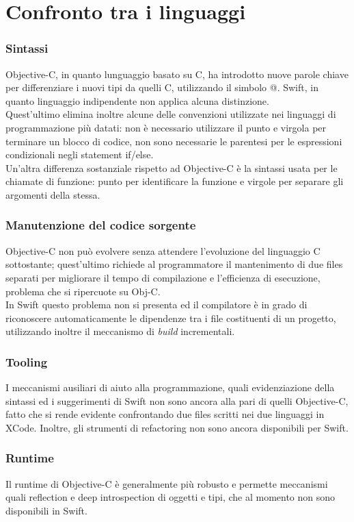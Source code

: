 \chapter{Confronto tra i linguaggi}
\subsection{Sintassi}
Objective-C, in quanto lunguaggio basato su C, ha introdotto nuove parole chiave per differenziare i nuovi tipi da quelli C, utilizzando il simbolo @. Swift, in quanto linguaggio indipendente non applica alcuna distinzione.\\
Quest'ultimo elimina inoltre alcune delle convenzioni utilizzate nei linguaggi di programmazione più datati: non è necessario utilizzare il punto e virgola per terminare un blocco di codice, non sono necessarie le parentesi per le espressioni condizionali negli statement if/else.\\
Un'altra differenza sostanziale rispetto ad Objective-C è la sintassi usata per le chiamate di funzione: punto per identificare la funzione e virgole per separare gli argomenti della stessa.
\subsection{Manutenzione del codice sorgente}
Objective-C non può evolvere senza attendere l'evoluzione del linguaggio C sottostante; quest'ultimo richiede al programmatore il mantenimento di due files separati per migliorare il tempo di compilazione e l'efficienza di esecuzione, problema che si ripercuote su Obj-C.\\
In Swift questo problema non si presenta ed il compilatore è in grado di riconoscere automaticamente le dipendenze tra i file costituenti di un progetto, utilizzando inoltre il meccanismo di \textit{build} incrementali.
\subsection{Tooling}
I meccanismi ausiliari di aiuto alla programmazione, quali evidenziazione della sintassi ed i suggerimenti di Swift non sono ancora alla pari di quelli Objective-C, fatto che si rende evidente confrontando due files scritti nei due linguaggi in XCode. Inoltre, gli strumenti di refactoring non sono ancora disponibili per Swift.
\subsection{Runtime}
Il runtime di Objective-C è generalmente più robusto e permette meccanismi quali reflection e deep introspection di oggetti e tipi, che al momento non sono disponibili in Swift.
